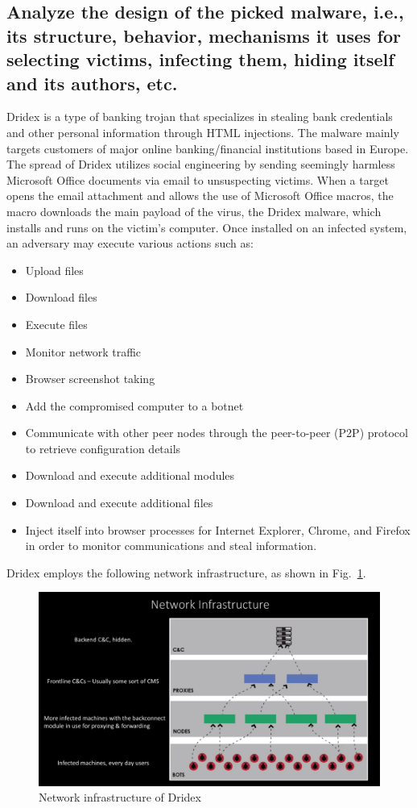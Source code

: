 \documentclass[conference]{IEEEtran}
\begin{document}
\subsection{Analyze the design of the picked malware, i.e., its structure, behavior, mechanisms it uses for selecting victims, infecting them, hiding itself and its authors, etc.}
Dridex is a type of banking trojan that specializes in stealing bank credentials and other personal information through HTML injections. The malware mainly targets customers of major online banking/financial institutions based in Europe. The spread of Dridex utilizes social engineering by sending seemingly harmless Microsoft Office documents via email to unsuspecting victims. When a target opens the email attachment and allows the use of Microsoft Office macros, the macro downloads the main payload of the virus, the Dridex malware, which installs and runs on the victim’s computer. Once installed on an infected system, an adversary may execute various actions such as:
\begin{itemize}
\item Upload files
\item Download files
\item Execute files
\item Monitor network traffic
\item Browser screenshot taking
\item Add the compromised computer to a botnet
\item Communicate with other peer nodes through the peer-to-peer (P2P) protocol to retrieve configuration details
\item Download and execute additional modules
\item Download and execute additional files
\item Inject itself into browser processes for Internet Explorer, Chrome, and Firefox in order to monitor communications and steal
 information.
\end{itemize}
Dridex employs the following network infrastructure, as shown in Fig.~\ref{fg1}.
\begin{figure}[h]
\centerline{\includegraphics[width=\textwidth]{img/dridex_network_infrastructure.png}}
\caption{Network infrastructure of Dridex}
\label{fg1}
\end{figure}
\end{document}
